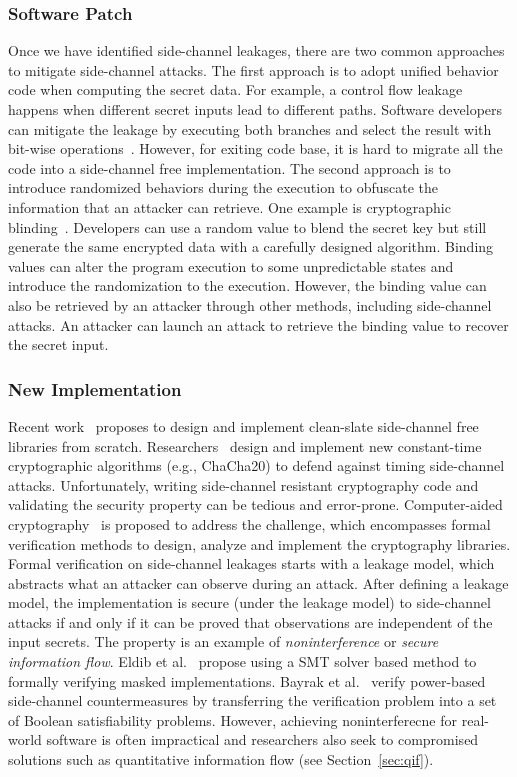\subsubsection*{Software Patch}
Once we have identified side-channel leakages, there are two common approaches to mitigate side-channel attacks. The first approach is to adopt unified behavior code when computing the secret data. For example, a control flow leakage happens when different secret inputs lead to different paths. Software developers can mitigate the leakage by executing both branches and select the result with bit-wise operations~\cite{Coppens:2009:PMT:1607723.1608124}. However, for exiting code base, it is hard to migrate all the code into a side-channel free implementation. The second approach is to introduce randomized behaviors during the execution to obfuscate the information that an attacker can retrieve. One example is cryptographic blinding~\cite{coron1999resistance}. Developers can use a random value to blend the secret key but still generate the same encrypted data with a carefully designed algorithm.  Binding values can alter the program execution to some unpredictable states and introduce the randomization to the execution. However, the binding value can also be retrieved by an attacker through other methods, including side-channel attacks. An attacker can launch an attack to retrieve the binding value to recover the secret input.

\subsubsection*{New Implementation}
Recent work~\cite{bernstein2012security,libsodium,zinzindohoue2017hacl,monocypher} proposes to design and implement clean-slate side-channel free libraries from scratch. Researchers~\cite{bernstein2008chacha,langley2016chacha20} design and implement new constant-time cryptographic algorithms (e.g., ChaCha20) to defend against timing side-channel attacks. Unfortunately, writing side-channel resistant cryptography code and validating the security property can be tedious and error-prone.  Computer-aided cryptography~\cite{barbosa2021sok} is proposed to address the challenge, which encompasses formal verification methods to design, analyze and implement the cryptography libraries. Formal verification on side-channel leakages starts with a leakage model, which abstracts what an attacker can observe during an attack. After defining a leakage model, the implementation is secure (under the leakage model) to side-channel attacks if and only if it can be proved that observations are independent of the input secrets. The property is an example of \textit{noninterference} or \textit{secure information flow}. Eldib et al.~\cite{eldib2014smt} propose using a SMT solver based method to formally verifying masked implementations. Bayrak et al.~\cite{bayrak2013sleuth} verify power-based side-channel countermeasures by transferring the verification problem into a set of Boolean satisfiability problems. However, achieving noninterferecne for real-world software is often impractical and researchers also seek to compromised solutions such as quantitative information flow (see Section~\ref{sec:qif}). 

